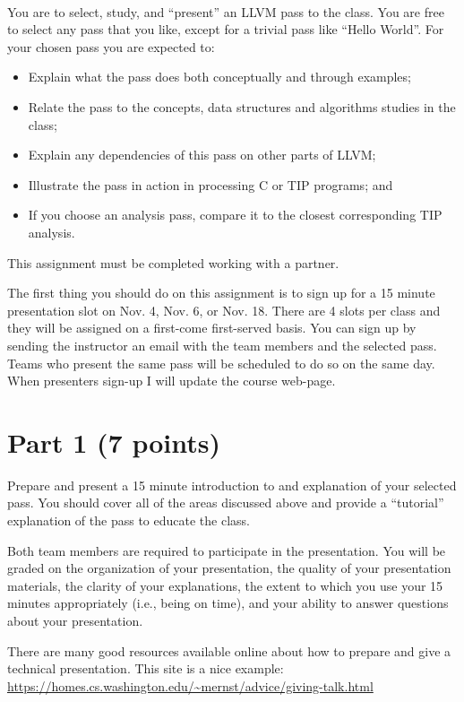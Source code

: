 \documentclass[12pt,letterpaper]{article}
\begin{document}
~

You are to select, study, and ``present'' an LLVM pass to the class.
You are free to select any pass that you like, except for a trivial
pass like ``Hello World''.
For your chosen pass you are expected to:
\begin{itemize}
\item Explain what the pass does both conceptually and through examples;
\item Relate the pass to the concepts, data structures and algorithms studies in the class;
\item Explain any dependencies of this pass on other parts of LLVM;
\item Illustrate the pass in action in processing C or TIP programs; and
\item If you choose an analysis pass, compare it to the closest corresponding TIP analysis. 
\end{itemize}

This assignment must be completed working with a partner.

The first thing you should do on this assignment is to sign up for
a 15 minute presentation slot on Nov. 4, Nov. 6, or Nov. 18.  There are
4 slots per class and they will be assigned on a first-come first-served
basis.  
You can sign up by sending the instructor an email with the 
team members and the selected pass.  Teams who present the same
pass will be scheduled to do so on the same day.   
When presenters sign-up I will update the course web-page.

\section*{Part 1 (7 points)}
Prepare and present a 15 minute introduction to and explanation of your
selected pass.  You should cover all of the areas discussed above and 
provide a ``tutorial'' explanation of the pass to educate the class.

Both team members are required to participate in the presentation.
You will be graded on the organization of your presentation,
the quality of your presentation materials,
the clarity of your explanations,
the extent to which you use your 15 minutes appropriately (i.e., being
on time),
and your ability to answer questions about your presentation. 

There are many good resources available online about how to prepare
and give a technical presentation.  This site is a nice example:
\url{https://homes.cs.washington.edu/~mernst/advice/giving-talk.html}
\end{document}
